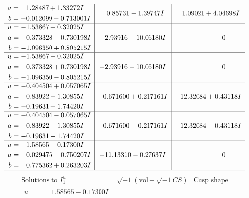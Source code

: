 \documentclass[1p]{elsarticle_modified}
\theoremstyle{definition}
\newcommand{\I}{\sqrt{-1}}
\begin{document}
$$\begin{array}{c|c|c}
\begin{aligned}
a &= \phantom{-}1.28487 + 1.33272 I \\
b &= -0.012099 - 0.713001 I\end{aligned}
 & \phantom{-}0.85731 - 1.39747 I & \phantom{-}1.09021 + 4.04698 I \\ \hline\begin{aligned}
u &= -1.53867 + 0.32025 I \\
a &= -0.373328 - 0.730198 I \\
b &= -1.096350 + 0.805215 I\end{aligned}
 & -2.93916 + 10.06180 I & \phantom{-0.000000 } 0 \\ \hline\begin{aligned}
u &= -1.53867 - 0.32025 I \\
a &= -0.373328 + 0.730198 I \\
b &= -1.096350 - 0.805215 I\end{aligned}
 & -2.93916 - 10.06180 I & \phantom{-0.000000 } 0 \\ \hline\begin{aligned}
u &= -0.404504 + 0.057065 I \\
a &= \phantom{-}0.83922 - 1.30855 I \\
b &= -0.19631 + 1.74420 I\end{aligned}
 & \phantom{-}0.671600 + 0.217161 I & -12.32084 + 0.43118 I \\ \hline\begin{aligned}
u &= -0.404504 - 0.057065 I \\
a &= \phantom{-}0.83922 + 1.30855 I \\
b &= -0.19631 - 1.74420 I\end{aligned}
 & \phantom{-}0.671600 - 0.217161 I & -12.32084 - 0.43118 I \\ \hline\begin{aligned}
u &= \phantom{-}1.58565 + 0.17300 I \\
a &= \phantom{-}0.029475 - 0.750207 I \\
b &= \phantom{-}0.775362 + 0.263203 I\end{aligned}
 & -11.13310 - 0.27637 I & \phantom{-0.000000 } 0\\
 \hline 
 \end{array}$$\newpage$$\begin{array}{c|c|c}  
\text{Solutions to }I^u_{1}& \I (\text{vol} + \sqrt{-1}CS) & \text{Cusp shape}\\
 \hline 
\begin{aligned}
u &= \phantom{-}1.58565 - 0.17300 I \\

\end{aligned}
\end{array}$$
\end{document}
